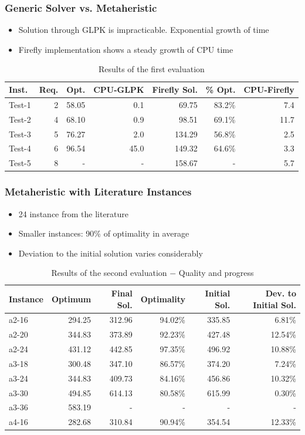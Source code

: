 \documentclass{beamer}
\begin{document}
\begin{frame}
\frametitle{Generic Solver vs. Metaheristic}
\begin{itemize}
\item Solution through GLPK is impracticable. Exponential growth of time
\item Firefly implementation shows a steady growth of CPU time
\end{itemize}
\begin{table}[h]
\centering
\caption{Results of the first evaluation}
\footnotesize
{}
\begin{tabular}{l | r | r | r | r | r | r}
\hline
\textbf{Inst.} & \textbf{Req.} & \textbf{Opt.} & \textbf{CPU-GLPK} & \textbf{Firefly Sol.} & \% \textbf{Opt.} & \textbf{CPU-Firefly}\\
\hline
Test-1 & 	2 & 58.05 & 	0.1 & 	69.75 & 	83.2\% & 	7.4 \\
Test-2 & 	4 & 68.10 & 	0.9 & 	98.51 & 	69.1\% & 	11.7 \\
Test-3 & 	5 & 76.27 & 	2.0 & 	134.29 & 	56.8\% & 	2.5 \\
Test-4 & 	6 & 96.54 & 	45.0 & 	149.32 & 	64.6\% & 	3.3 \\
Test-5 & 	8 & - & 	- & 	158.67 & 	- & 	5.7 \\
\hline
\end{tabular}
\label{tab:evaluation-1}
\end{table}
\end{frame}

\begin{frame}
\frametitle{Metaheristic with Literature Instances}
\begin{itemize}
\item 24 instance from the literature
\item Smaller instances: 90\% of optimality in average
\item Deviation to the initial solution varies considerably
\end{itemize}
\begin{table}[H]
\centering
\caption{Results of the second evaluation $-$ Quality and progress}
\scriptsize
{}
\begin{tabular}{l | r | r | r | r | r}
\hline
Instance & Optimum & Final Sol. & Optimality & Initial Sol. & Dev. to Initial Sol.\\
\hline
a2-16 & 	294.25 & 	312.96 & 	94.02\% & 	335.85 & 	6.81\% \\
a2-20 & 	344.83 & 	373.89 & 	92.23\% & 	427.48 & 	12.54\% \\
a2-24 & 	431.12 & 	442.85 & 	97.35\% & 	496.92 & 	10.88\% \\
a3-18 & 	300.48 & 	347.10 & 	86.57\% & 	374.20 & 	7.24\% \\
a3-24 & 	344.83 & 	409.73 & 	84.16\% & 	456.86 & 	10.32\% \\
a3-30 & 	494.85 & 	614.13 & 	80.58\% & 	615.99 & 	0.30\% \\
a3-36 & 	583.19 & 	- & 	- & 	- & 	- \\
a4-16 & 	282.68 & 	310.84 & 	90.94\% & 	354.54 & 	12.33\% \\
\hline
\end{tabular}
\end{table}
\end{frame}
\end{document}
